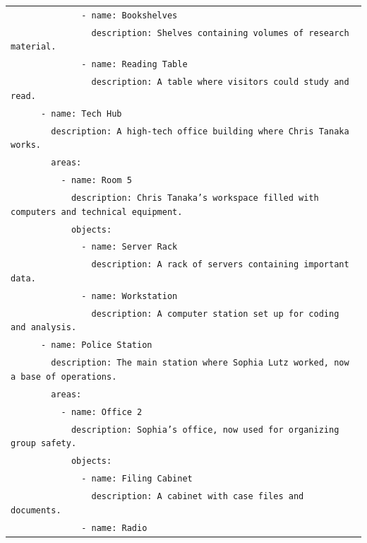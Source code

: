 \documentclass[letterpaper]{article} %
\begin{document}
\begin{small}
\begin{longtable}{p{\textwidth}}
    \texttt{\ \ \ \ \ \ \ \ \ \ \ \ \ \ - name: Bookshelves} \\
    \texttt{\ \ \ \ \ \ \ \ \ \ \ \ \ \ \ \ description: Shelves containing volumes of research material.} \\
    \texttt{\ \ \ \ \ \ \ \ \ \ \ \ \ \ - name: Reading Table} \\
    \texttt{\ \ \ \ \ \ \ \ \ \ \ \ \ \ \ \ description: A table where visitors could study and read.} \\
    \texttt{\ \ \ \ \ \ - name: Tech Hub} \\
    \texttt{\ \ \ \ \ \ \ \ description: A high-tech office building where Chris Tanaka works.} \\
    \texttt{\ \ \ \ \ \ \ \ areas:} \\
    \texttt{\ \ \ \ \ \ \ \ \ \ - name: Room 5} \\
    \texttt{\ \ \ \ \ \ \ \ \ \ \ \ description: Chris Tanaka's workspace filled with computers and technical equipment.} \\
    \texttt{\ \ \ \ \ \ \ \ \ \ \ \ objects:} \\
    \texttt{\ \ \ \ \ \ \ \ \ \ \ \ \ \ - name: Server Rack} \\
    \texttt{\ \ \ \ \ \ \ \ \ \ \ \ \ \ \ \ description: A rack of servers containing important data.} \\
    \texttt{\ \ \ \ \ \ \ \ \ \ \ \ \ \ - name: Workstation} \\
    \texttt{\ \ \ \ \ \ \ \ \ \ \ \ \ \ \ \ description: A computer station set up for coding and analysis.} \\
    \texttt{\ \ \ \ \ \ - name: Police Station} \\
    \texttt{\ \ \ \ \ \ \ \ description: The main station where Sophia Lutz worked, now a base of operations.} \\
    \texttt{\ \ \ \ \ \ \ \ areas:} \\
    \texttt{\ \ \ \ \ \ \ \ \ \ - name: Office 2} \\
    \texttt{\ \ \ \ \ \ \ \ \ \ \ \ description: Sophia's office, now used for organizing group safety.} \\
    \texttt{\ \ \ \ \ \ \ \ \ \ \ \ objects:} \\
    \texttt{\ \ \ \ \ \ \ \ \ \ \ \ \ \ - name: Filing Cabinet} \\
    \texttt{\ \ \ \ \ \ \ \ \ \ \ \ \ \ \ \ description: A cabinet with case files and documents.} \\
    \texttt{\ \ \ \ \ \ \ \ \ \ \ \ \ \ - name: Radio} \\

\end{longtable}
\end{small}
\end{document}
